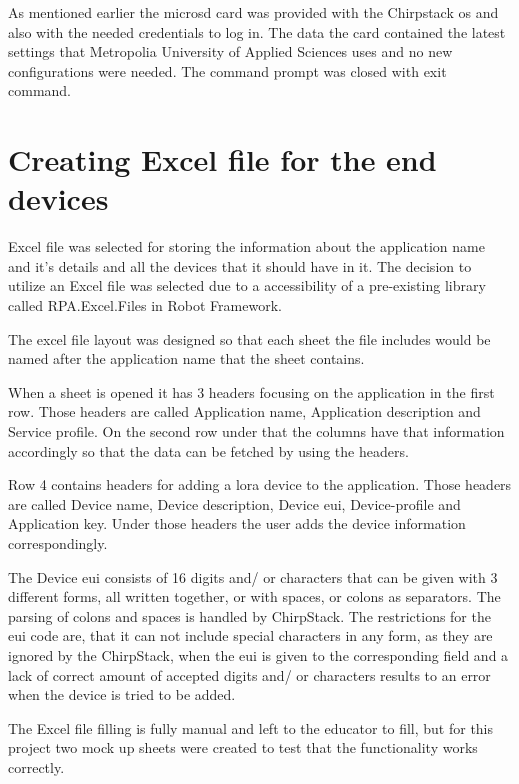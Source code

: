 


As mentioned earlier the micro\gls{sd} card was provided with the Chirpstack \gls{os} and also with the needed credentials to log in.
The data the card contained the latest settings that Metropolia University of Applied Sciences uses and no new configurations were needed.
The command prompt was closed with exit command.

\section{Creating Excel file for the end devices}
Excel file was selected for storing the information about the application name and it's details and all the devices that it should have in it.
The decision to utilize an Excel file was selected due to a accessibility of a pre-existing library called RPA.Excel.Files in Robot Framework.

The excel file layout was designed so that each sheet the file includes would be named after the application name that the sheet contains.

When a sheet is opened it has 3 headers focusing on the application in the first row.
Those headers are called Application name, Application description and Service profile.
On the second row under that the columns have that information accordingly so that the data can be fetched by using the headers.

Row 4 contains headers for adding a \gls{lora} device to the application.
Those headers are called Device name, Device description, Device \gls{eui}, Device-profile and Application key.
Under those headers the user adds the device information correspondingly.

The Device \gls{eui} consists of 16 digits and/ or characters that can be given with 3 different forms, all written together, or with spaces, or colons as separators.
The parsing of colons and spaces is handled by ChirpStack.
The restrictions for the \gls{eui} code are, that it can not include special characters in any form, as they are ignored by the ChirpStack, when the \gls{eui} is given to the corresponding field and a lack of correct amount of accepted digits and/ or characters results to an error when the device is tried to be added.

The Excel file filling is fully manual and left to the educator to fill, but for this project two mock up sheets were created to test that the functionality works correctly.

